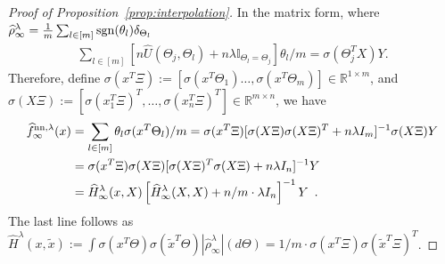 \documentclass[11pt]{article}
\numberwithin{equation}{section}
\begin{document}
\begin{proof}[Proof of Proposition~\ref{prop:interpolation}]
In the matrix form, where $\widehat{\rho}^{\lambda}_\infty = \frac{1}{m}\sum_{l\in [m]} {\rm sgn}(\theta_l) \delta_{\Theta_l} $
\begin{align*}
    \sum_{l \in [m]} \left[ n \widehat{U}(\Theta_j, \Theta_l) + n \lambda \mathbb{I}_{\Theta_l = \Theta_j} \right] \theta_l/m = \sigma(\Theta_j^T X) Y .
\end{align*}
Therefore, define $\sigma(x^T \Xi) := [\sigma(x^T\Theta_1) \ldots, \sigma(x^T\Theta_m)] \in \mathbb{R}^{1 \times m}$, and $\sigma(X \Xi) := [\sigma(x_1^T \Xi)^T,\ldots, \sigma(x_n^T \Xi)^T] \in \mathbb{R}^{m \times n}$, we have
\begin{align*}
    \widehat{f}^{{\rm nn}, \lambda}_{\infty} (x) &= \sum_{l \in [m]}  \theta_l \sigma(x^T \Theta_l) / m  = \sigma(x^T \Xi) [ \sigma(X \Xi)\sigma(X \Xi)^T + n\lambda I_m]^{-1} \sigma(X \Xi) Y \\
    & = \sigma(x^T \Xi) \sigma(X \Xi) [ \sigma(X \Xi)^T \sigma(X \Xi) + n\lambda I_n]^{-1} Y \\
    &= \widehat{H}_{\infty}^{\lambda}(x, X) \left[  \widehat{H}_{\infty}^{\lambda} (X, X) + n/m \cdot \lambda I_n\right]^{-1} Y \enspace.
\end{align*}
The last line follows as $\widehat{H}^{\lambda}(x, \tilde{x}):= \int \sigma(x^T \Theta) \sigma(\tilde{x}^T \Theta) |\widehat{\rho}^{\lambda}_\infty|(d\Theta) = 1/m \cdot \sigma(x^T \Xi) \sigma(\tilde{x}^T \Xi)^T$.


\end{proof}
\end{document}
